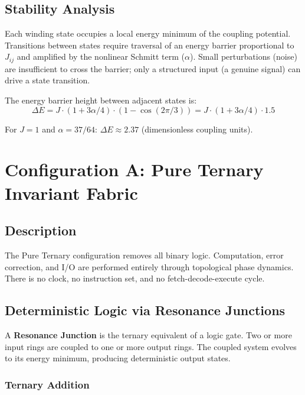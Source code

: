 \documentclass[11pt, a4paper]{article}
\begin{document}
\subsection{Stability Analysis}

Each winding state occupies a local energy minimum of the coupling potential.
Transitions between states require traversal of an energy barrier proportional
to $J_{ij}$ and amplified by the nonlinear Schmitt term ($\alpha$). Small
perturbations (noise) are insufficient to cross the barrier; only a structured
input (a genuine signal) can drive a state transition.

The energy barrier height between adjacent states is:
\begin{equation}
  \Delta E = J \cdot (1 + 3\alpha/4) \cdot (1 - \cos(2\pi/3))
           = J \cdot (1 + 3\alpha/4) \cdot 1.5
\end{equation}

For $J = 1$ and $\alpha = 37/64$: $\Delta E \approx 2.37$ (dimensionless
coupling units).

\section{Configuration A: Pure Ternary Invariant Fabric}

\subsection{Description}

The Pure Ternary configuration removes all binary logic. Computation,
error correction, and I/O are performed entirely through topological
phase dynamics. There is no clock, no instruction set, and no
fetch-decode-execute cycle.

\subsection{Deterministic Logic via Resonance Junctions}

A \textbf{Resonance Junction} is the ternary equivalent of a logic gate.
Two or more input rings are coupled to one or more output rings. The
coupled system evolves to its energy minimum, producing deterministic
output states.

\subsubsection{Ternary Addition}
\end{document}
